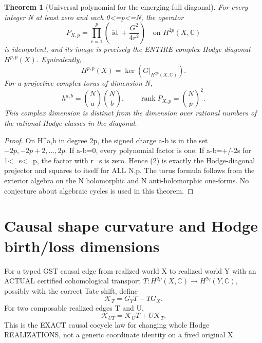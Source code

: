\documentclass[11pt]{article}
\newtheorem{theorem}{Theorem}
\begin{document}
\begin{theorem}[Universal polynomial for the emerging full diagonal]
For every integer N at least zero and each 0<=p<=N,
the operator
\[
 \boxed{
 P_{X,p}=\prod_{r=1}^{p}
       \left(\operatorname{id}
                 +\frac{G^2}{4r^2}\right)
            \quad\text{on }H^{2p}(X,\mathbb C)          } \tag{2}
\]
is idempotent, and its image is precisely the ENTIRE
complex Hodge diagonal \(H^{p,p}(X)\). Equivalently,
\[
 \boxed{H^{p,p}(X)=\ker(G|_{H^{2p}(X,\mathbb C)}).}   \tag{3}
\]
For a projective complex torus of dimension N,
\[
 h^{a,b}={N\choose a}{N\choose b},\qquad
 \operatorname{rank}P_{X,p}={N\choose p}^{2}.       \tag{4}
\]
This complex dimension is distinct from the
dimension over rational numbers of the rational
Hodge classes in the diagonal.
\end{theorem}
\begin{proof}
On H^{a,b} in degree 2p, the signed charge
a-b is in the set \(-2p,-2p+2,\ldots,2p\).
If a-b=0, every polynomial factor is one.
If a-b=+/-2s for 1<=s<=p, the factor with r=s
is zero. Hence (2) is exactly the Hodge-diagonal
projector and squares to itself for ALL N,p.
The torus formula follows from the exterior
algebra on the N holomorphic and N anti-holomorphic
one-forms. No conjecture about algebraic cycles
is used in this theorem.
\end{proof}

\section{Causal shape curvature and Hodge birth/loss dimensions}
For a typed GST causal edge from realized world X to
realized world Y with an ACTUAL certified cohomological
transport \(T:H^{2p}(X,\mathbb C)\to H^{2q}(Y,\mathbb C)\),
possibly with the correct Tate shift, define
\[
 \boxed{\mathcal K_T=G_YT-TG_X.}                   \tag{5}
\]
For two composable realized edges T and U,
\[
 \boxed{\mathcal K_{UT}=\mathcal K_U T
                              +U\mathcal K_T.}  \tag{6}
\]
This is the EXACT causal cocycle law for changing
whole Hodge REALIZATIONS, not a generic coordinate
identity on a fixed original X.
\end{document}
